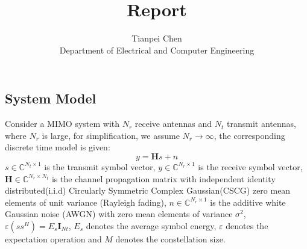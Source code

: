 \documentclass[12pt,a4paper,final]{article}
\title{Report}
\author{Tianpei Chen\\
 Department of Electrical and Computer Engineering\\}
\begin{document}
\begin{spacing}{2.5}
\maketitle







%



\section{System Model}\label{system}
Consider a MIMO system with $N_r$ receive antennas and $N_t$ transmit antennas, where $N_r$ is large, for simplification, we assume $N_r\to\infty$, the corresponding discrete time model is given:
\begin{equation}
y=\mathbf{H}s+n
\end{equation}
$s\in \mathbb{C}^{N_{t}\times 1}$ is the transmit symbol vector, $y\in \mathbb{C}^{N_{r}\times 1}$ is the receive symbol vector, $\mathbf{H}\in \mathbb{C}^{N_{r}\times N_{t}}$ is the channel propagation matrix with independent identity distributed(i.i.d) Circularly Symmetric Complex Gaussian(CSCG) zero mean elements of unit variance (Rayleigh fading), $n\in \mathbb{C}^{N_{r}\times 1}$ is the additive white Gaussian noise (AWGN) with zero mean elements of variance $\sigma^{2}$, $\varepsilon(ss^{H})=E_{s}\mathbf{I}_{Nt}$, $E_s$ denotes the average symbol energy, $\varepsilon$ denotes the expectation operation and $M$ denotes the constellation size. 



\end{spacing}
\end{document}

